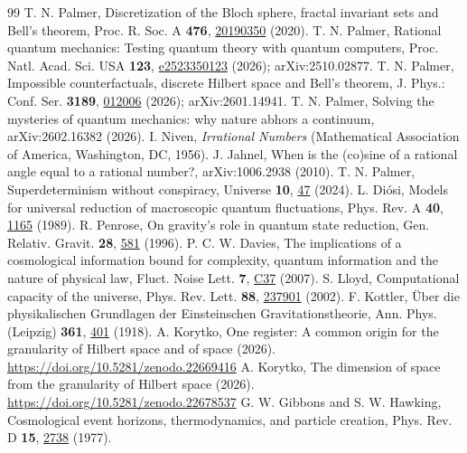\documentclass[aps,prd,twocolumn,superscriptaddress,nofootinbib,showkeys]{revtex4-2}
\begin{document}
\begin{thebibliography}{99}
 T. N. Palmer, Discretization of the Bloch sphere, fractal invariant sets and Bell's theorem, Proc. R. Soc. A \textbf{476}, \href{https://doi.org/10.1098/rspa.2019.0350}{20190350} (2020).
 T. N. Palmer, Rational quantum mechanics: Testing quantum theory with quantum computers, Proc. Natl. Acad. Sci. USA \textbf{123}, \href{https://doi.org/10.1073/pnas.2523350123}{e2523350123} (2026); arXiv:2510.02877.
 T. N. Palmer, Impossible counterfactuals, discrete Hilbert space and Bell's theorem, J. Phys.: Conf. Ser. \textbf{3189}, \href{https://doi.org/10.1088/1742-6596/3189/1/012006}{012006} (2026); arXiv:2601.14941.
 T. N. Palmer, Solving the mysteries of quantum mechanics: why nature abhors a continuum, arXiv:2602.16382 (2026).
 I. Niven, \emph{Irrational Numbers} (Mathematical Association of America, Washington, DC, 1956).
 J. Jahnel, When is the (co)sine of a rational angle equal to a rational number?, arXiv:1006.2938 (2010).
 T. N. Palmer, Superdeterminism without conspiracy, Universe \textbf{10}, \href{https://doi.org/10.3390/universe10010047}{47} (2024).
 L. Di\'osi, Models for universal reduction of macroscopic quantum fluctuations, Phys. Rev. A \textbf{40}, \href{https://doi.org/10.1103/PhysRevA.40.1165}{1165} (1989).
 R. Penrose, On gravity's role in quantum state reduction, Gen. Relativ. Gravit. \textbf{28}, \href{https://doi.org/10.1007/BF02105068}{581} (1996).
 P. C. W. Davies, The implications of a cosmological information bound for complexity, quantum information and the nature of physical law, Fluct. Noise Lett. \textbf{7}, \href{https://doi.org/10.1142/S0219477507004021}{C37} (2007).
 S. Lloyd, Computational capacity of the universe, Phys. Rev. Lett. \textbf{88}, \href{https://doi.org/10.1103/PhysRevLett.88.237901}{237901} (2002).
 F. Kottler, \"Uber die physikalischen Grundlagen der Einsteinschen Gravitationstheorie, Ann. Phys. (Leipzig) \textbf{361}, \href{https://doi.org/10.1002/andp.19183611402}{401} (1918).
 A. Korytko, One register: A common origin for the granularity of Hilbert space and of space (2026). \url{https://doi.org/10.5281/zenodo.22669416}
 A. Korytko, The dimension of space from the granularity of Hilbert space (2026). \url{https://doi.org/10.5281/zenodo.22678537}
 G. W. Gibbons and S. W. Hawking, Cosmological event horizons, thermodynamics, and particle creation, Phys. Rev. D \textbf{15}, \href{https://doi.org/10.1103/PhysRevD.15.2738}{2738} (1977).

\end{thebibliography}
\end{document}
